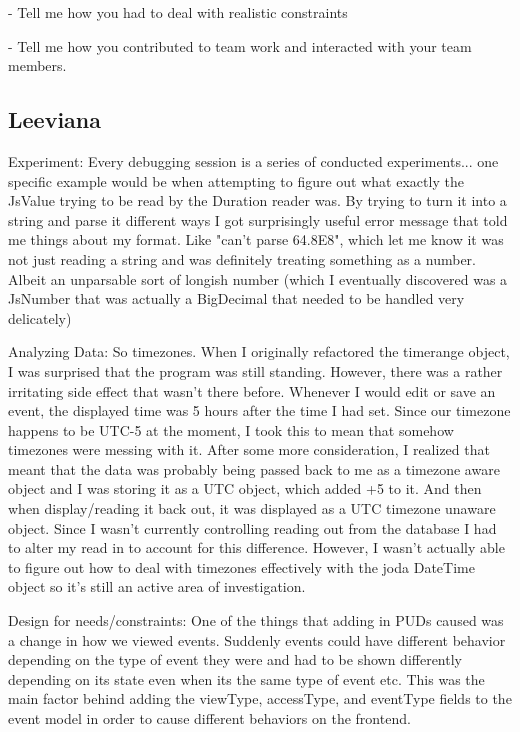 \documentclass{article}
\begin{document}
- Tell me how you had to deal with realistic constraints

- Tell me how you contributed to team work and interacted with your team members.
 
 
\subsection{Leeviana}

Experiment: Every debugging session is a series of conducted experiments... one specific example would be when attempting to figure out what exactly the JsValue trying to be read by the Duration reader was. By trying to turn it into a string and parse it different ways I got surprisingly useful error message that told me things about my format. Like "can't parse 64.8E8", which let me know it was not just reading a string and was definitely treating something as a number. Albeit an unparsable sort of longish number (which I eventually discovered was a JsNumber that was actually a BigDecimal that needed to be handled very delicately)

Analyzing Data: So timezones. When I originally refactored the timerange object, I was surprised that the program was still standing. However, there was a rather irritating side effect that wasn't there before. Whenever I would edit or save an event, the displayed time was 5 hours after the time I had set. Since our timezone happens to be UTC-5 at the moment, I took this to mean that somehow timezones were messing with it. After some more consideration, I realized that meant that the data was probably being passed back to me as a timezone aware object and I was storing it as a UTC object, which added +5 to it. And then when display/reading it back out, it was displayed as a UTC timezone unaware object. Since I wasn't currently controlling reading out from the database I had to alter my read in to account for this difference. However, I wasn't actually able to figure out how to deal with timezones effectively with the joda DateTime object so it's still an active area of investigation.

Design for needs/constraints: One of the things that adding in PUDs caused was a change in how we viewed events. Suddenly events could have different behavior depending on the type of event they were and had to be shown differently depending on its state even when its the same type of event etc. This was the main factor behind adding the viewType, accessType, and eventType fields to the event model in order to cause different behaviors on the frontend.
\end{document}
